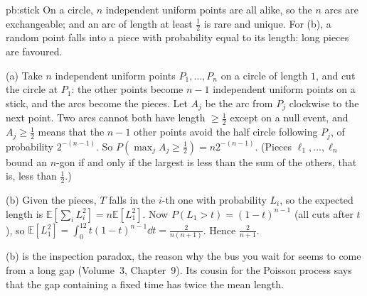 \begin{solution}{pb:stick}
\idea On a circle, $n$ independent uniform points are all alike, so the $n$ arcs are exchangeable; and an arc of length at least $\frac12$
is rare and unique. For (b), a random point falls into a piece with probability equal to its length: long pieces are favoured.

\writeup (a) Take $n$ independent uniform points $P_1,\dots,P_n$ on a circle of length $1$, and cut the circle at $P_1$: the other points become
$n-1$ independent uniform points on a stick, and the arcs become the pieces. Let $A_j$ be the arc from $P_j$ clockwise to the next point.
Two arcs cannot both have length $\ge\frac12$ except on a null event, and $A_j\ge\frac12$ means that the $n-1$ other points avoid the half circle
following $P_j$, of probability $2^{-(n-1)}$. So $P(\max_jA_j\ge\frac12)=n2^{-(n-1)}$. (Pieces $\ell_1,\dots,\ell_n$ bound an $n$-gon if and only if the
largest is less than the sum of the others, that is, less than $\frac12$.)

(b) Given the pieces, $T$ falls in the $i$-th one with probability $L_i$, so the expected length is $\mathbb E[\sum_iL_i^2]=n\mathbb E[L_1^2]$. Now
$P(L_1>t)=(1-t)^{n-1}$ (all cuts after $t$), so $\mathbb E[L_1^2]=\int_0^12t(1-t)^{n-1}\dd t=\frac2{n(n+1)}$. Hence $\frac2{n+1}$.

\leads (b) is the inspection paradox, the reason why the bus you wait for seems to come from a long gap (Volume~3, Chapter~9). Its cousin for
the Poisson process says that the gap containing a fixed time has twice the mean length.
\end{solution}

